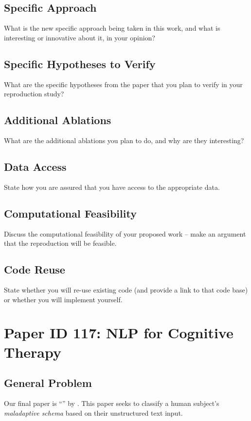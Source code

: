 \documentclass[11pt,a4paper]{article}
\begin{document}
\subsection{Specific Approach}
What is the new specific approach being taken in this work, and what is interesting or innovative about it, in your opinion?

\subsection{Specific Hypotheses to Verify}
What are the specific hypotheses from the paper that you plan to verify in your reproduction study?

\subsection{Additional Ablations}
What are the additional ablations you plan to do, and why are they interesting?

\subsection{Data Access}
State how you are assured that you have access to the appropriate data.

\subsection{Computational Feasibility}
Discuss the computational feasibility of your proposed work – make an argument that the reproduction will be feasible.

\subsection{Code Reuse}
State whether you will re-use existing code (and provide a link to that code base) or whether you will implement yourself.

\section{Paper ID 117: NLP for Cognitive Therapy}
\subsection{General Problem}
Our final paper is ``'' by \citeauthor*{burger_2021}. This paper seeks to classify a human subject's \emph{maladaptive schema} based on their unstructured text input. 
\end{document}
